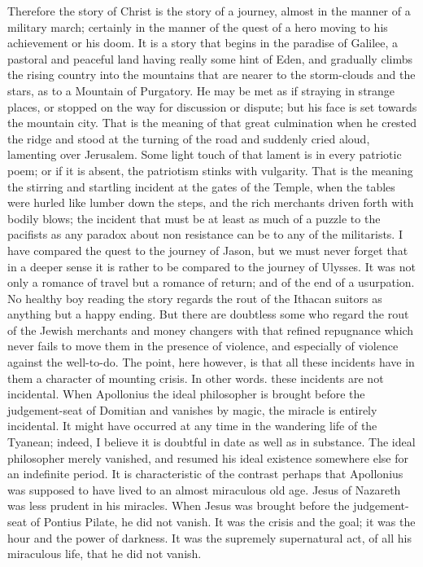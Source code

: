 Therefore the story of Christ is the story of a journey, almost in the manner of a military march; certainly in the manner of the quest of a hero moving to his achievement or his doom. It is a story that begins in the paradise of Galilee, a pastoral and peaceful land having really some hint of Eden, and gradually climbs the rising country into the mountains that are nearer to the storm-clouds and the stars, as to a Mountain of Purgatory. He may be met as if straying in strange places, or stopped on the way for discussion or dispute; but his face is set towards the mountain city. That is the meaning of that great culmination when he crested the ridge and stood at the turning of the road and suddenly cried aloud, lamenting over Jerusalem. Some light touch of that lament is in every patriotic poem; or if it is absent, the patriotism stinks with vulgarity. That is the meaning the stirring and startling incident at the gates of the Temple, when the tables were hurled like lumber down the steps, and the rich merchants driven forth with bodily blows; the incident that must be at least as much of a puzzle to the pacifists as any paradox about non resistance can be to any of the militarists. I have compared the quest to the journey of Jason, but we must never forget that in a deeper sense it is rather to be compared to the journey of Ulysses. It was not only a romance of travel but a romance of return; and of the end of a usurpation. No healthy boy reading the story regards the rout of the Ithacan suitors as anything but a happy ending. But there are doubtless some who regard the rout of the Jewish merchants and money changers with that refined repugnance which never fails to move them in the presence of violence, and especially of violence against the well-to-do. The point, here however, is that all these incidents have in them a character of mounting crisis. In other words. these incidents are not incidental. When Apollonius the ideal philosopher is brought before the judgement-seat of Domitian and vanishes by magic, the miracle is entirely incidental. It might have occurred at any time in the wandering life of the Tyanean; indeed, I believe it is doubtful in date as well as in substance. The ideal philosopher merely vanished, and resumed his ideal existence somewhere else for an indefinite period. It is characteristic of the contrast perhaps that Apollonius was supposed to have lived to an almost miraculous old age. Jesus of Nazareth was less prudent in his miracles. When Jesus was brought before the judgement-seat of Pontius Pilate, he did not vanish. It was the crisis and the goal; it was the hour and the power of darkness. It was the supremely supernatural act, of all his miraculous life, that he did not vanish.

